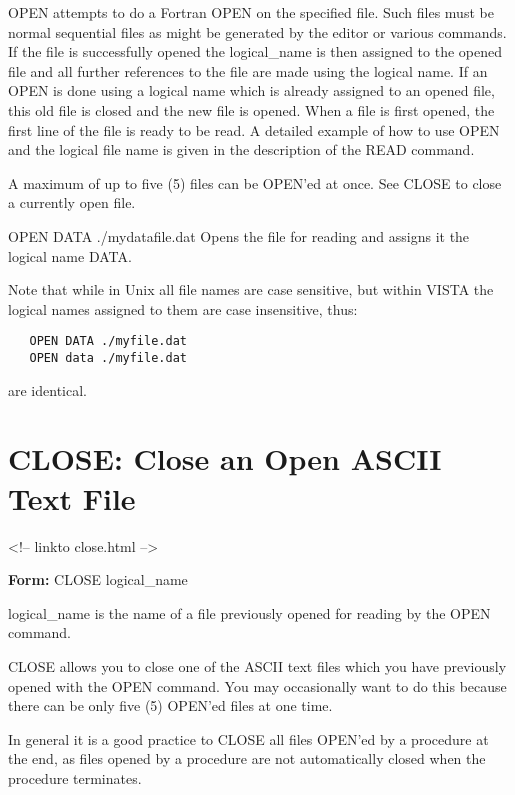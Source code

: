 OPEN attempts to do a Fortran OPEN on the specified file. Such files must
be normal sequential files as might be generated by the editor or various
commands.  If the file is successfully opened the logical\_name is then
assigned to the opened file and all further references to the file are made
using the logical name. If an OPEN is done using a logical name which is
already assigned to an opened file, this old file is closed and the new
file is opened.  When a file is first opened, the first line of the file is
ready to be read.  A detailed example of how to use OPEN and the logical
file name is given in the description of the READ command. 

A maximum of up to five (5) files can be OPEN'ed at once.  See CLOSE to
close a currently open file.

\begin{example}
  \item[OPEN DATA ./mydatafile.dat\hfill]{ Opens the file for reading
       and assigns it the logical name DATA.}
\end{example}

Note that while in Unix all file names are case sensitive, but within
VISTA the logical names assigned to them are case insensitive, thus:
\begin{verbatim}
   OPEN DATA ./myfile.dat
   OPEN data ./myfile.dat
\end{verbatim}
are identical.

\section{CLOSE: Close an Open ASCII Text File}
\begin{rawhtml}
<!-- linkto close.html -->
\end{rawhtml}
\begin{command}
  \item[\textbf{Form: }CLOSE logical\_name\hfill]{}
  \item[logical\_name]{is the name of a file previously
       opened for reading by the OPEN command.}
\end{command}

CLOSE allows you to close one of the ASCII text files which you have
previously opened with the OPEN command.  You may occasionally want to do
this because there can be only five (5) OPEN'ed files at one time.  

In general it is a good practice to CLOSE all files OPEN'ed by a procedure
at the end, as files opened by a procedure are not automatically closed
when the procedure terminates.


